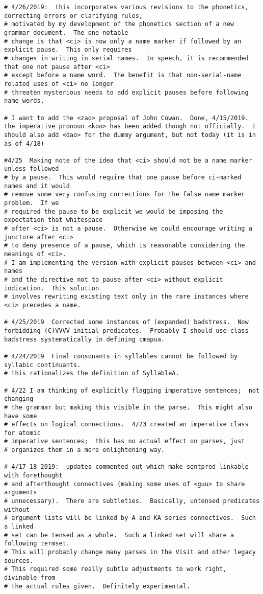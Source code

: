 \documentclass[12pt]{book}
\begin{document}
{\begin{verbatim}
# 4/26/2019:  this incorporates various revisions to the phonetics, correcting errors or clarifying rules,
# motivated by my development of the phonetics section of a new grammar document.  The one notable
# change is that <ci> is now only a name marker if followed by an explicit pause.  This only requires
# changes in writing in serial names.  In speech, it is recommended that one not pause after <ci>
# except before a name word.  The benefit is that non-serial-name related uses of <ci> no longer
# threaten mysterious needs to add explicit pauses before following name words.

# I want to add the <zao> proposal of John Cowan.  Done, 4/15/2019.  the imperative pronoun <koo> has been added though not officially.  I should also add <dao> for the dummy argument, but not today (it is in as of 4/18)

#4/25  Making note of the idea that <ci> should not be a name marker unless followed
# by a pause.  This would require that one pause before ci-marked names and it would
# remove some very confusing corrections for the false name marker problem.  If we
# required the pause to be explicit we would be imposing the expectation that whitespace
# after <ci> is not a pause.  Otherwise we could encourage writing a juncture after <ci>
# to deny presence of a pause, which is reasonable considering the meanings of <ci>.
# I am implementing the version with explicit pauses between <ci> and names
# and the directive not to pause after <ci> without explicit indication.  This solution
# involves rewriting existing text only in the rare instances where <ci> precedes a name.

# 4/25/2019  Corrected some instances of (expanded) badstress.  Now forbidding (C)VVVV initial predicates.  Probably I should use class badstress systematically in defining cmapua.

# 4/24/2019  Final consonants in syllables cannot be followed by syllabic continuants.  
# this rationalizes the definition of SyllableA.

# 4/22 I am thinking of explicitly flagging imperative sentences;  not changing
# the grammar but making this visible in the parse.  This might also have some
# effects on logical connections.  4/23 created an imperative class for atomic
# imperative sentences;  this has no actual effect on parses, just
# organizes them in a more enlightening way.

# 4/17-18 2019:  updates commented out which make sentpred linkable with forethought
# and afterthought connectives (making some uses of <guu> to share arguments 
# unnecessary).  There are subtleties.  Basically, untensed predicates without
# argument lists will be linked by A and KA series connectives.  Such a linked
# set can be tensed as a whole.  Such a linked set will share a following termset.
# This will probably change many parses in the Visit and other legacy sources.
# This required some really subtle adjustments to work right, divinable from
# the actual rules given.  Definitely experimental.


\end{verbatim}}
\end{document}
